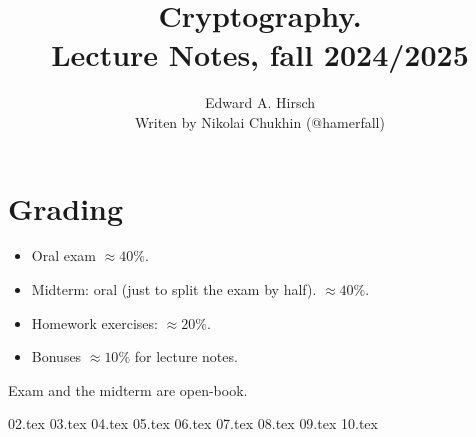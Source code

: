 \documentclass[14pt]{book}
\theoremstyle{definition}
\numberwithin{equation}{section} %
\numberwithin{figure}{section} %
\numberwithin{table}{section} %
\begin{document}
    \title{Cryptography. \\ Lecture Notes, fall 2024/2025}
    \author{Edward A. Hirsch \\ Writen by Nikolai Chukhin (@hamerfall)}
    \date{}
    \maketitle
    \newpage

    \tableofcontents
    \newpage

    \section{Grading}
    \begin{itemize}
        \item Oral exam $\approx 40\%$.
        \item Midterm: oral (just to split the exam by half). $\approx 40\%$.
        \item Homework exercises: $\approx 20\%$.
        \item Bonuses $\approx 10\%$ for lecture notes.
    \end{itemize}
    Exam and the midterm are open-book.

    {02.tex}
    {03.tex}
    {04.tex}
    {05.tex}
    {06.tex}
    {07.tex}
    {08.tex}
    {09.tex}
    {10.tex}

    \clearpage
    \listoftodos
\end{document}
